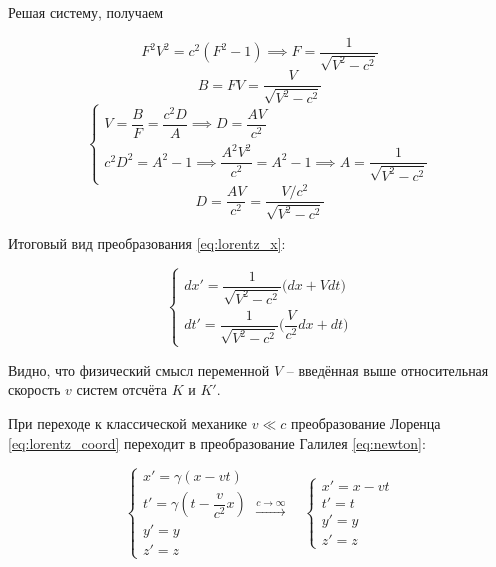 \documentclass{article}
\begin{document}
Решая систему, получаем

\begin{equation*}
    F^2V^2=c^2\left(F^2-1\right) \implies F=\frac{1}{\sqrt{V^2-c^2}}
\end{equation*}
\begin{equation*}
    B=FV=\frac{V}{\sqrt{V^2-c^2}}
\end{equation*}
\begin{equation*}
    \begin{cases}
    V=\dfrac{B}{F}=\dfrac{c^2D}{A} \implies D=\dfrac{AV}{c^2}\\
    c^2D^2=A^2-1 \implies \dfrac{A^2V^2}{c^2}=A^2-1 \implies A=\dfrac{1}{\sqrt{V^2-c^2}}
    \end{cases}
\end{equation*}
\begin{equation*}
    D=\frac{AV}{c^2}=\frac{V/c^2}{\sqrt{V^2-c^2}}
\end{equation*}

Итоговый вид преобразования \eqref{eq:lorentz_x}:

\begin{equation*}
    \begin{cases}
    dx'=\dfrac{1}{\sqrt{V^2-c^2}}\big(dx+Vdt\big)\\
    dt'=\dfrac{1}{\sqrt{V^2-c^2}}\big(\dfrac{V}{c^2}dx+dt\big)
    \end{cases}
\end{equation*}

Видно, что физический смысл переменной $V$ -- введённая выше относительная скорость $v$ систем отсчёта $K$ и $K'$.

При переходе к классической механике $v\ll c$ преобразование Лоренца \eqref{eq:lorentz_coord} переходит в преобразование Галилея \eqref{eq:newton}:

\begin{equation*}
    \begin{cases}
    x'=\gamma\left(x-vt\right)\\
    t'=\gamma\left(t-\dfrac{v}{c^2}x\right)\\
    y'=y\\
    z'=z
    \end{cases}
    \xrightarrow{c\to\infty}\quad
    \begin{cases}
    x'=x-vt\\
    t'=t\\
    y'=y\\
    z'=z
    \end{cases}
\end{equation*}
\end{document}
